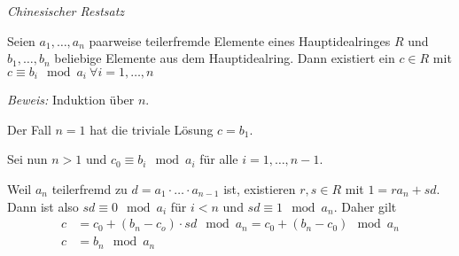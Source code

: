\begin{mysatz} \textit{Chinesischer Restsatz}

    Seien $a_1, \ldots, a_n$ paarweise teilerfremde Elemente eines Hauptidealringes $R$ und $b_1, \ldots, b_n$ beliebige Elemente aus dem Hauptidealring.
    Dann existiert ein $c \in R$ mit $c \equiv b_i \mod a_i \ \forall i=1, \ldots, n$

    \textit{Beweis:} Induktion über $n$.

    Der Fall $n=1$ hat die triviale Lösung $c=b_1$.
    
    Sei nun $n>1$ und $c_0 \equiv b_i \mod a_i$ für alle $i=1, \ldots, n-1$.

    Weil $a_n$ teilerfremd zu $d = a_1 \cdot \ldots \cdot a_{n-1}$ ist, existieren $r, s \in R$ mit $1 = ra_n + sd$.
    Dann ist also $sd \equiv 0 \mod a_i$ für $i < n$ und $sd \equiv 1 \mod a_n$.
    Daher gilt
    \begin{align*}
        c & = c_0 + (b_n - c_o) \cdot sd \mod a_n = c_0 + (b_n - c_0) \mod a_n \\
        c & = b_n \mod a_n
    \end{align*}
\end{mysatz}
